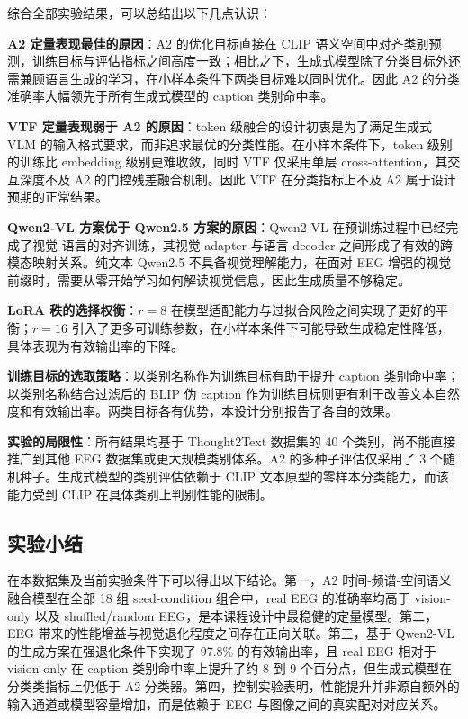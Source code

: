 综合全部实验结果，可以总结出以下几点认识：

\textbf{A2 定量表现最佳的原因}：A2 的优化目标直接在 CLIP 语义空间中对齐类别预测，训练目标与评估指标之间高度一致；相比之下，生成式模型除了分类目标外还需兼顾语言生成的学习，在小样本条件下两类目标难以同时优化。因此 A2 的分类准确率大幅领先于所有生成式模型的 caption 类别命中率。

\textbf{VTF 定量表现弱于 A2 的原因}：token 级融合的设计初衷是为了满足生成式 VLM 的输入格式要求，而非追求最优的分类性能。在小样本条件下，token 级别的训练比 embedding 级别更难收敛，同时 VTF 仅采用单层 cross-attention，其交互深度不及 A2 的门控残差融合机制。因此 VTF 在分类指标上不及 A2 属于设计预期的正常结果。

\textbf{Qwen2-VL 方案优于 Qwen2.5 方案的原因}：Qwen2-VL 在预训练过程中已经完成了视觉-语言的对齐训练，其视觉 adapter 与语言 decoder 之间形成了有效的跨模态映射关系。纯文本 Qwen2.5 不具备视觉理解能力，在面对 EEG 增强的视觉前缀时，需要从零开始学习如何解读视觉信息，因此生成质量不够稳定。

\textbf{LoRA 秩的选择权衡}：$r=8$ 在模型适配能力与过拟合风险之间实现了更好的平衡；$r=16$ 引入了更多可训练参数，在小样本条件下可能导致生成稳定性降低，具体表现为有效输出率的下降。

\textbf{训练目标的选取策略}：以类别名称作为训练目标有助于提升 caption 类别命中率；以类别名称结合过滤后的 BLIP 伪 caption 作为训练目标则更有利于改善文本自然度和有效输出率。两类目标各有优势，本设计分别报告了各自的效果。

\textbf{实验的局限性}：所有结果均基于 Thought2Text 数据集的 40 个类别，尚不能直接推广到其他 EEG 数据集或更大规模类别体系。A2 的多种子评估仅采用了 3 个随机种子。生成式模型的类别评估依赖于 CLIP 文本原型的零样本分类能力，而该能力受到 CLIP 在具体类别上判别性能的限制。

\subsection{实验小结}

在本数据集及当前实验条件下可以得出以下结论。第一，A2 时间-频谱-空间语义融合模型在全部 18 组 seed-condition 组合中，real EEG 的准确率均高于 vision-only 以及 shuffled/random EEG，是本课程设计中最稳健的定量模型。第二，EEG 带来的性能增益与视觉退化程度之间存在正向关联。第三，基于 Qwen2-VL 的生成方案在强退化条件下实现了 97.8\% 的有效输出率，且 real EEG 相对于 vision-only 在 caption 类别命中率上提升了约 8 到 9 个百分点，但生成式模型在分类类指标上仍低于 A2 分类器。第四，控制实验表明，性能提升并非源自额外的输入通道或模型容量增加，而是依赖于 EEG 与图像之间的真实配对对应关系。
